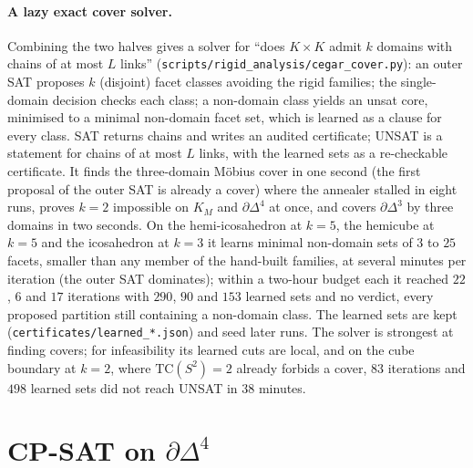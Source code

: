 \documentclass[12pt]{article}
\newcommand{\TC}{\mathrm{TC}}
\begin{document}
\paragraph{A lazy exact cover solver.}  Combining the two halves gives a
solver for ``does $K\times K$ admit $k$ domains with chains of at most $L$
links'' (\texttt{scripts/rigid\_analysis/}\allowbreak\texttt{cegar\_cover.py}): an outer SAT
proposes $k$ (disjoint) facet classes avoiding the rigid families; the
single-domain decision checks each class; a non-domain class yields an unsat
core, minimised to a minimal non-domain facet set, which is learned as a
clause for every class.  SAT returns chains and writes an audited
certificate; UNSAT is a statement for chains of at most $L$ links, with the
learned sets as a re-checkable certificate.  It finds the three-domain
M\"obius cover in one second (the first proposal of the outer SAT is already
a cover) where the annealer stalled in eight runs, proves $k=2$ impossible
on $K_M$ and $\partial\Delta^4$ at once, and covers $\partial\Delta^3$ by
three domains in two seconds.  On the hemi-icosahedron at $k=5$, the
hemicube at $k=5$ and the icosahedron at $k=3$ it learns minimal non-domain
sets of $3$ to $25$ facets, smaller than any member of the hand-built
families, at several minutes per iteration (the outer SAT dominates); within
a two-hour budget each it reached $22$, $6$ and $17$ iterations with $290$,
$90$ and $153$ learned sets and no verdict, every proposed partition still
containing a non-domain class.  The learned sets are kept
(\texttt{certificates/learned\_*.json}) and seed later runs.  The solver is
strongest at finding covers; for
infeasibility its learned cuts are local, and on the cube boundary at $k=2$,
where $\TC(S^2)=2$ already forbids a cover, $83$ iterations and $498$
learned sets did not reach UNSAT in $38$ minutes.

\section{CP-SAT on \texorpdfstring{$\partial\Delta^4$}{the 3-sphere model}}\label{sec:sat}
\end{document}
